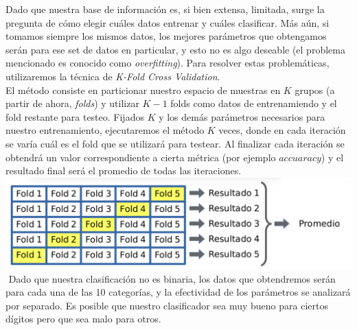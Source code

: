 Dado que nuestra base de información es, si bien extensa, limitada, surge la pregunta de cómo elegir cuáles datos entrenar y cuáles clasificar. Más aún, si tomamos siempre los mismos datos, los mejores parámetros que obtengamos serán para ese set de datos en particular, y esto no es algo deseable (el problema mencionado es conocido como \textit{overfitting}). Para resolver estas problemáticas, utilizaremos la técnica de \textit{K-Fold Cross Validation}. \\

El método consiste en particionar nuestro espacio de muestras en $K$ grupos (a partir de ahora, \textit{folds}) y utilizar $K - 1$ folds como datos de entrenamiendo y el fold restante para testeo. Fijados $K$ y los demás parámetros necesarios para nuestro entrenamiento, ejecutaremos el método $K$ veces, donde en cada iteración se varía cuál es el fold que se utilizará para testear. Al finalizar cada iteración se obtendrá un valor correspondiente a cierta métrica (por ejemplo $accuaracy$) y el resultado final será el promedio de todas las iteraciones. \\

{\centering
    \includegraphics[scale=0.30]{informe/imagenes/kfold/kfoldEjemplo2.png} \\
}
$ $\newline
Dado que nuestra clasificación no es binaria, los datos que obtendremos serán para cada una de las 10 categorías, y la efectividad de los parámetros se analizará por separado. Es posible que nuestro clasificador sea muy bueno para ciertos dígitos pero que sea malo para otros. \\



